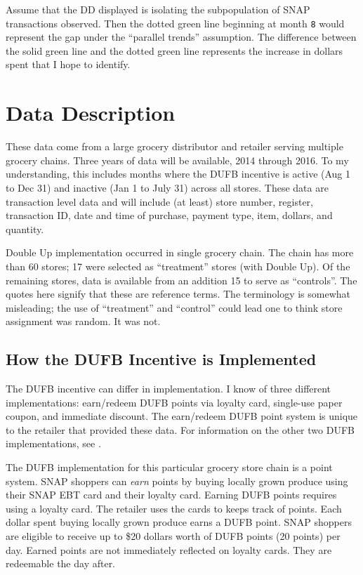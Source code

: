 \documentclass[12pt,letterpaperpaper,]{book}
\begin{document}
Assume that the DD displayed is isolating the subpopulation of SNAP
transactions observed. Then the dotted green line beginning at month
\texttt{8} would represent the gap under the ``parallel trends''
assumption. The difference between the solid green line and the dotted
green line represents the increase in dollars spent that I hope to
identify.

\newpage

\hypertarget{data-1}{\section*{Data Description}\label{data-1}}

These data come from a large grocery distributor and retailer serving
multiple grocery chains. Three years of data will be available, 2014
through 2016. To my understanding, this includes months where the DUFB
incentive is active (Aug 1 to Dec 31) and inactive (Jan 1 to July 31)
across all stores. These data are transaction level data and will
include (at least) store number, register, transaction ID, date and time
of purchase, payment type, item, dollars, and quantity.

Double Up implementation occurred in single grocery chain. The chain has
more than 60 stores; 17 were selected as ``treatment'' stores (with
Double Up). Of the remaining stores, data is available from an addition
15 to serve as ``controls''. The quotes here signify that these are
reference terms. The terminology is somewhat misleading; the use of
``treatment'' and ``control'' could lead one to think store assignment
was random. It was not.

\subsection*{How the DUFB Incentive is
Implemented}\label{how-the-dufb-incentive-is-implemented}

The DUFB incentive can differ in implementation. I know of three
different implementations: earn/redeem DUFB points via loyalty card,
single-use paper coupon, and immediate discount. The earn/redeem DUFB
point system is unique to the retailer that provided these data. For
information on the other two DUFB implementations, see
\citep{margaret_schnuck_doubling_2016}.

The DUFB implementation for this particular grocery store chain is a
point system. SNAP shoppers can \emph{earn} points by buying locally
grown produce using their SNAP EBT card and their loyalty card. Earning
DUFB points requires using a loyalty card. The retailer uses the cards
to keeps track of points. Each dollar spent buying locally grown produce
earns a DUFB point. SNAP shoppers are eligible to receive up to \$20
dollars worth of DUFB points (20 points) per day. Earned points are not
immediately reflected on loyalty cards. They are redeemable the day
after.
\end{document}
